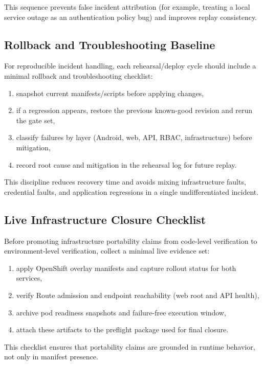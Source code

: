 This sequence prevents false incident attribution (for example, treating a local
service outage as an authentication policy bug) and improves replay consistency.

\subsection{Rollback and Troubleshooting Baseline}
For reproducible incident handling, each rehearsal/deploy cycle should include a
minimal rollback and troubleshooting checklist:
\begin{enumerate}
    \item snapshot current manifests/scripts before applying changes,
    \item if a regression appears, restore the previous known-good revision and rerun the gate set,
    \item classify failures by layer (Android, web, API, RBAC, infrastructure) before mitigation,
    \item record root cause and mitigation in the rehearsal log for future replay.
\end{enumerate}

This discipline reduces recovery time and avoids mixing infrastructure faults,
credential faults, and application regressions in a single undifferentiated incident.

\subsection{Live Infrastructure Closure Checklist}
Before promoting infrastructure portability claims from code-level verification to
environment-level verification, collect a minimal live evidence set:
\begin{enumerate}
    \item apply OpenShift overlay manifests and capture rollout status for both services,
    \item verify Route admission and endpoint reachability (web root and API health),
    \item archive pod readiness snapshots and failure-free execution window,
    \item attach these artifacts to the preflight package used for final closure.
\end{enumerate}

This checklist ensures that portability claims are grounded in runtime behavior,
not only in manifest presence.

